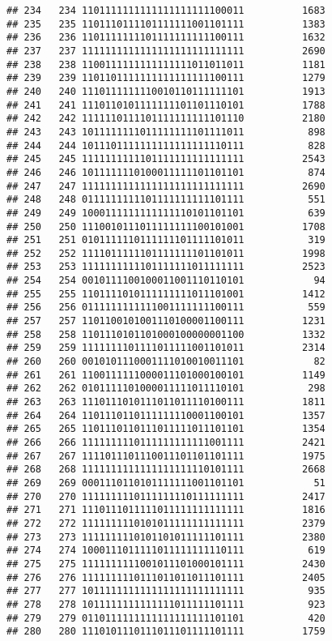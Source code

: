 \documentclass[]{article}
\begin{document}
\begin{verbatim}
## 234   234 1101111111111111111111100011          1683
## 235   235 1101110111101111111001101111          1383
## 236   236 1101111111101111111111100111          1632
## 237   237 1111111111111111111111111111          2690
## 238   238 1100111111111111111011011011          1181
## 239   239 1101101111111111111111100111          1279
## 240   240 1110111111110010110111111101          1913
## 241   241 1110110101111111101101110101          1788
## 242   242 1111110111101111111111101110          2180
## 243   243 1011111111011111111101111011           898
## 244   244 1011101111111111111111110111           828
## 245   245 1111111111101111111111111111          2543
## 246   246 1011111110100011111101101101           874
## 247   247 1111111111111111111111111111          2690
## 248   248 0111111111101111111111101111           551
## 249   249 1000111111111111110101101101           639
## 250   250 1110010111011111111100101001          1708
## 251   251 0101111110111111101111101011           319
## 252   252 1111011111101111111101101011          1998
## 253   253 1111111111101111111011111111          2523
## 254   254 0010111100100011001110110101            94
## 255   255 1101111010111111111011101001          1412
## 256   256 0111111111111001111111100111           559
## 257   257 1101100101001110100001100111          1231
## 258   258 1101110101101000100000001100          1332
## 259   259 1111111101111011111001101011          2314
## 260   260 0010101110001111010010011101            82
## 261   261 1100111111000011101000100101          1149
## 262   262 0101111101000011111011110101           298
## 263   263 1110111010111011011110100111          1811
## 264   264 1101110110111111110001100101          1357
## 265   265 1101110110111011111011101101          1354
## 266   266 1111111110111111111111001111          2421
## 267   267 1111011101110011101101101111          1975
## 268   268 1111111111111111111110101111          2668
## 269   269 0001110110101111111001101101            51
## 270   270 1111111110111111110111111111          2417
## 271   271 1110111011111011111111111111          1816
## 272   272 1111111110101011111111111111          2379
## 273   273 1111111110101101011111101111          2380
## 274   274 1000111011111011111111110111           619
## 275   275 1111111111001011101000101111          2430
## 276   276 1111111110111011011011101111          2405
## 277   277 1011111111111111111111111111           935
## 278   278 1011111111111111011111101111           923
## 279   279 0110111111111111111111101101           420
## 280   280 1110101110111011101111101111          1759

\end{verbatim}
\end{document}
